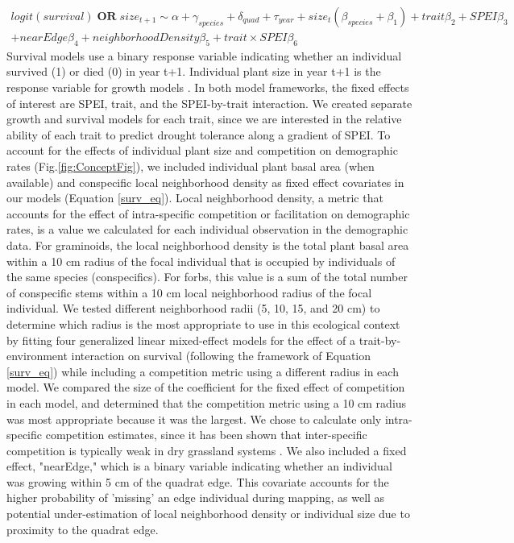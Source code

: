 \documentclass[12pt, letterpaper]{article}
\begin{document}
\begin{multline}
\label{surv_eq}
logit(survival)\;\mathbf{OR}\;size_{t+1}\sim \alpha + \gamma_{species}+ \delta_{quad} + \tau_{year} + size_t(\beta_{species}  + \beta_1) + trait\beta_2+ SPEI\beta_3\\ + nearEdge\beta_4  + neighborhoodDensity\beta_5 + trait\times SPEI\beta_6
\end{multline}
Survival models use a binary response variable indicating whether an individual survived (1) or died (0) in year t+1. Individual plant size in year t+1 is the response variable for growth models \citep{Dalgleish2011ClimatePlants, Dahlgren2009LinkingHerb}. In both model frameworks, the fixed effects of interest are SPEI, trait, and the SPEI-by-trait interaction. We created separate growth and survival models for each trait, since we are interested in the relative ability of each trait to predict drought tolerance along a gradient of SPEI. To account for the effects of individual plant size \citep{Tredennick2018} and competition on demographic rates (Fig.\ref{fig:ConceptFig}), we included individual plant basal area (when available) and conspecific local neighborhood density as fixed effect covariates in our models (Equation \ref{surv_eq}). Local neighborhood density, a metric that accounts for the effect of intra-specific competition or facilitation on demographic rates, is a value we calculated for each individual observation in the demographic data. For graminoids, the local neighborhood density is the total plant basal area within a 10 cm radius of the focal individual that is occupied by individuals of the same species (conspecifics). For forbs, this value is a sum of the total number of conspecific stems within a 10 cm local neighborhood radius of the focal individual. We tested different neighborhood radii (5, 10, 15, and 20 cm) to determine which radius is the most appropriate to use in this ecological context by fitting four generalized linear mixed-effect models for the effect of a trait-by-environment interaction on survival (following the framework of Equation \ref{surv_eq}) while including a competition metric using a different radius in each model. We compared the size of the coefficient for the fixed effect of competition in each model, and determined that the competition metric using a 10 cm radius was most appropriate because it was the largest. We chose to calculate only intra-specific competition estimates, since it has been shown that inter-specific competition is typically weak in dry grassland systems \citep{Adler2018}. We also included a fixed effect, "nearEdge," which is a binary variable indicating whether an individual was growing within 5 cm of the quadrat edge. This covariate accounts for the higher probability of 'missing' an edge individual during mapping, as well as potential under-estimation of local neighborhood density or individual size due to proximity to the quadrat edge. 
\end{document}
